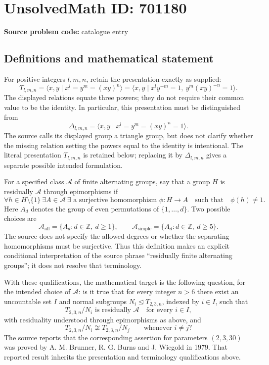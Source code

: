 \documentclass[11pt]{article}
\newcommand{\Z}{\mathbb{Z}}
\begin{document}
\section*{UnsolvedMath ID: 701180}
\textbf{Source problem code:} catalogue entry
\subsection{Definitions and mathematical statement}
For positive integers \(l,m,n\), retain the presentation exactly as supplied:
\[
T_{l,m,n}=\langle x,y\mid x^l=y^m=(xy)^n\rangle
=\langle x,y\mid x^l y^{-m}=1,\ y^m(xy)^{-n}=1\rangle.
\]
The displayed relations equate three powers; they do not require their common value to be the identity. In particular, this presentation must be distinguished from
\[
\Delta_{l,m,n}=\langle x,y\mid x^l=y^m=(xy)^n=1\rangle.
\]
The source calls its displayed group a triangle group, but does not clarify whether the missing relation setting the powers equal to the identity is intentional. The literal presentation \(T_{l,m,n}\) is retained below; replacing it by \(\Delta_{l,m,n}\) gives a separate possible intended formulation.

For a specified class \(\mathcal A\) of finite alternating groups, say that a group \(H\) is residually \(\mathcal A\) through epimorphisms if
\[
\forall h\in H\setminus\{1\}\ \exists A\in\mathcal A\ \exists\text{ a surjective homomorphism }\phi:H\longrightarrow A
\quad\text{such that}\quad \phi(h)\ne1.
\]
Here \(A_d\) denotes the group of even permutations of \(\{1,\ldots,d\}\). Two possible choices are
\[
\mathcal A_{\mathrm{all}}=\{A_d:d\in\Z,\ d\ge1\},
\qquad
\mathcal A_{\mathrm{simple}}=\{A_d:d\in\Z,\ d\ge5\}.
\]
The source does not specify the allowed degrees or whether the separating homomorphisms must be surjective. Thus this definition makes an explicit conditional interpretation of the source phrase ``residually finite alternating groups''; it does not resolve that terminology.

With these qualifications, the mathematical target is the following question, for the intended choice of \(\mathcal A\): is it true that for every integer \(n>6\) there exist an uncountable set \(I\) and normal subgroups \(N_i\trianglelefteq T_{2,3,n}\), indexed by \(i\in I\), such that
\[
T_{2,3,n}/N_i\text{ is residually }\mathcal A
\quad\text{for every }i\in I,
\]
with residuality understood through epimorphisms as above, and
\[
T_{2,3,n}/N_i\not\cong T_{2,3,n}/N_j
\qquad\text{whenever }i\ne j?
\]
The source reports that the corresponding assertion for parameters \((2,3,30)\) was proved by A. M. Brunner, R. G. Burns and J. Wiegold in 1979. That reported result inherits the presentation and terminology qualifications above.
\end{document}
